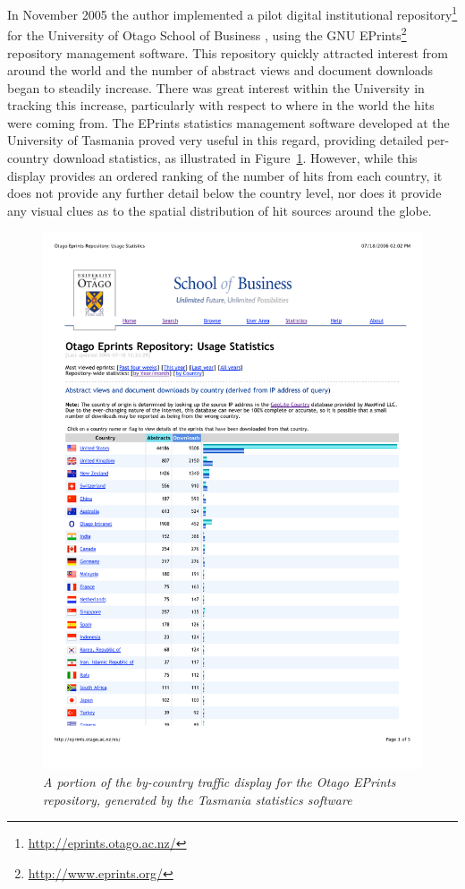 \documentclass[10pt]{article}
\begin{document}
In November 2005 the author implemented a pilot digital institutional repository\footnote{\url{http://eprints.otago.ac.nz/}} for the University of Otago School of Business \cite{Stan-N-2006-running}, using the GNU EPrints\footnote{\url{http://www.eprints.org/}} repository management software. This repository quickly attracted interest from around the world and the number of abstract views and document downloads began to steadily increase. There was great interest within the University in tracking this increase, particularly with respect to where in the world the hits were coming from. The EPrints statistics management software developed at the University of Tasmania \cite{Sale-A-2006-stats} proved very useful in this regard, providing detailed per-country download statistics, as illustrated in Figure~\ref{fig-tas-stats}. However, while this display provides an ordered ranking of the number of hits from each country, it does not provide any further detail below the country level, nor does it provide any visual clues as to the spatial distribution of hit sources around the globe.


\begin{figure}
	\centering
	\includegraphics[width=\textwidth,keepaspectratio]{tasmania_stats}
	\caption{\textit{A portion of the by-country traffic display for the Otago EPrints repository, generated by the Tasmania statistics software
	\protect\cite{Sale-A-2006-stats}}}
	\label{fig-tas-stats}
\end{figure}
\end{document}

